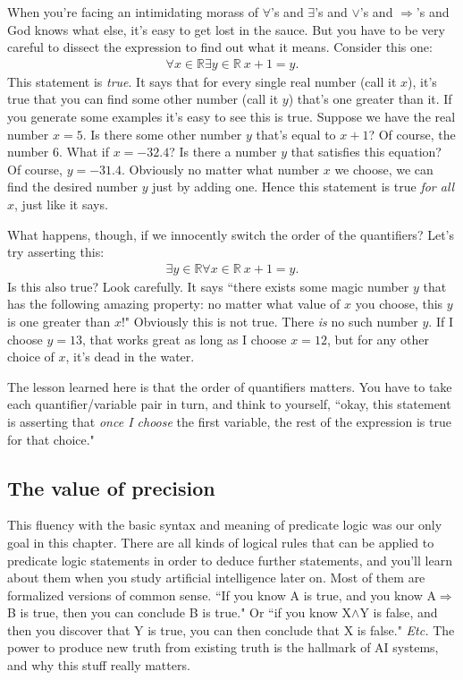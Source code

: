 When you're facing an intimidating morass of $\forall$'s and $\exists$'s
and $\vee$'s and $\Rightarrow$'s and God knows what else, it's easy to get
lost in the sauce. But you have to be very careful to dissect the
expression to find out what it means. Consider this one:
\begin{align}
\forall x \in \mathbb{R} \exists y \in \mathbb{R} \ x+1=y.
\end{align}
This statement is \textit{true}. It says that for every single real number
(call it $x$), it's true that you can find some other number (call it $y$)
that's one greater than it. If you generate some examples it's easy to see
this is true. Suppose we have the real number $x=5$. Is there some other
number $y$ that's equal to $x+1$? Of course, the number 6. What if
$x=-32.4$? Is there a number $y$ that satisfies this equation? Of course,
$y=-31.4$. Obviously no matter what number $x$ we choose, we can find the
desired number $y$ just by adding one. Hence this statement is true
\textit{for all} $x$, just like it says.

What happens, though, if we innocently switch the order of the quantifiers?
Let's try asserting this:
\begin{align}
\exists y \in \mathbb{R} \forall x \in \mathbb{R} \ x+1=y.
\end{align}
Is this also true? Look carefully. It says ``there exists some magic number
$y$ that has the following amazing property: no matter what value of $x$
you choose, this $y$ is one greater than $x$!" Obviously this is not true.
There \textit{is} no such number $y$. If I choose $y=13$, that works great
as long as I choose $x=12$, but for any other choice of $x$, it's dead in
the water.

The lesson learned here is that the order of quantifiers matters. You have
to take each quantifier/variable pair in turn, and think to yourself,
``okay, this statement is asserting that \textit{once I choose} the first
variable, the rest of the expression is true for that choice."

\subsection{The value of precision}

This fluency with the basic syntax and meaning of predicate logic was our
only goal in this chapter. There are all kinds of logical rules that can be
applied to predicate logic statements in order to deduce further
statements, and you'll learn about them when you study artificial
intelligence later on. Most of them are formalized versions of common
sense. ``If you know A is true, and you know A$\Rightarrow$B is true, then
you can conclude B is true." Or ``if you know X$\wedge$Y is false, and then
you discover that Y is true, you can then conclude that X is false."
\textit{Etc.} The power to produce new truth from existing truth is the
hallmark of AI systems, and why this stuff really matters.

